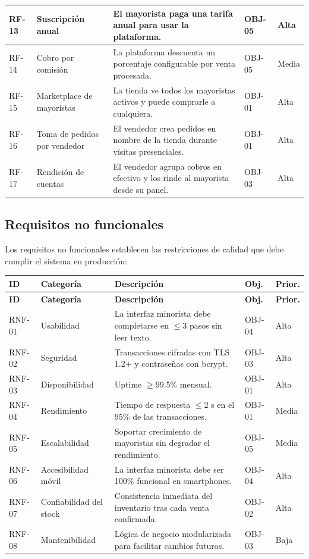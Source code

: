 \documentclass[12pt, a4paper]{article}
\begin{document}
\begin{longtable}{|C{1cm}|L{3cm}|L{6cm}|C{1.2cm}|C{1.2cm}|}
RF-13 & Suscripción anual & El mayorista paga una tarifa anual para usar la plataforma. & OBJ-05 & Alta \\ \hline
RF-14 & Cobro por comisión & La plataforma descuenta un porcentaje configurable por venta procesada. & OBJ-05 & Media \\ \hline
RF-15 & Marketplace de mayoristas & La tienda ve todos los mayoristas activos y puede comprarle a cualquiera. & OBJ-01 & Alta \\ \hline
RF-16 & Toma de pedidos por vendedor & El vendedor crea pedidos en nombre de la tienda durante visitas presenciales. & OBJ-01 & Alta \\ \hline
RF-17 & Rendición de cuentas & El vendedor agrupa cobros en efectivo y los rinde al mayorista desde su panel. & OBJ-03 & Alta \\ \hline
\end{longtable}

\subsection{Requisitos no funcionales}

Los requisitos no funcionales establecen las restricciones de calidad que debe cumplir el sistema en producción:

\begin{longtable}{|C{1cm}|L{2.5cm}|L{6.5cm}|C{1.2cm}|C{1.2cm}|}
\hline
\textbf{ID} & \textbf{Categoría} & \textbf{Descripción} & \textbf{Obj.} & \textbf{Prior.} \\
\hline
\endfirsthead
\hline
\textbf{ID} & \textbf{Categoría} & \textbf{Descripción} & \textbf{Obj.} & \textbf{Prior.} \\
\hline
\endhead
RNF-01 & Usabilidad & La interfaz minorista debe completarse en $\leq$3 pasos sin leer texto. & OBJ-04 & Alta \\ \hline
RNF-02 & Seguridad & Transacciones cifradas con TLS 1.2+ y contraseñas con bcrypt. & OBJ-03 & Alta \\ \hline
RNF-03 & Disponibilidad & Uptime $\geq$99.5\% mensual. & OBJ-01 & Alta \\ \hline
RNF-04 & Rendimiento & Tiempo de respuesta $\leq$2 s en el 95\% de las transacciones. & OBJ-01 & Media \\ \hline
RNF-05 & Escalabilidad & Soportar crecimiento de mayoristas sin degradar el rendimiento. & OBJ-05 & Media \\ \hline
RNF-06 & Accesibilidad móvil & La interfaz minorista debe ser 100\% funcional en smartphones. & OBJ-04 & Alta \\ \hline
RNF-07 & Confiabilidad del stock & Consistencia inmediata del inventario tras cada venta confirmada. & OBJ-02 & Alta \\ \hline
RNF-08 & Mantenibilidad & Lógica de negocio modularizada para facilitar cambios futuros. & OBJ-03 & Baja \\ \hline
\end{longtable}
\end{document}
